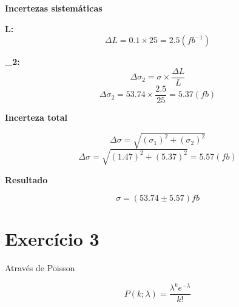 \documentclass{article}
\begin{document}
{{{           \vspace{1cm}

           \textbf{Incertezas sistemáticas}

           \vspace{1cm}
           
           \textbf{\Delta L:}\\
           \[ \Delta L = 0.1 \times 25 = 2.5(fb^{-1})\]

            \vspace{1cm}

           \textbf{\Delta \sigma_2:}\\
           \[ \Delta \sigma_2 = \sigma \times \frac{ \Delta L }{L}\]
           \vspace{0.2 cm}           
           \[ \Delta \sigma_2 = 53.74 \times \frac{2.5}{25} = 5.37 (fb) \]
           
           \vspace{1cm}

           \textbf{Incerteza total}

           \vspace{1cm}

           \[\Delta \sigma = \sqrt{(\sigma_1)^2 + (\sigma_2)^2}\]
           \vspace{0.2 cm} 
           \[\Delta \sigma = \sqrt{(1.47)^2 + (5.37)^2} = 5.57(fb) \]

           \vspace{1cm}

           \textbf{Resultado}

           \vspace{1cm}

           \[ \sigma = (53.74 \pm 5.57)fb\]         
          }
       }  

    \newpage
      \section*{Exercício 3}

      \vspace{0.5cm}
      
      Através de Poisson

      \vspace{0.5cm}
      
     {\Large 
        \[P( k; \lambda) = \frac{\lambda^k e^{- \lambda} }{k!} \]
        
      \vspace{0.5cm}

}}
\end{document}
